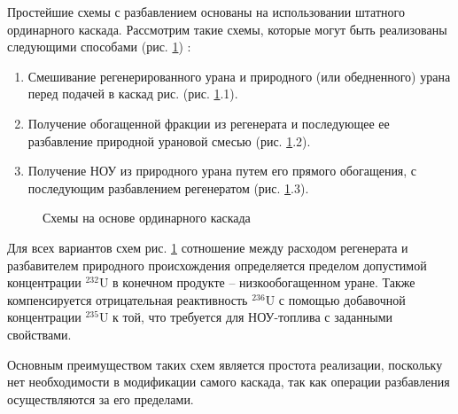 Простейшие схемы с разбавлением основаны на использовании штатного ординарного каскада. Рассмотрим такие схемы, которые могут быть реализованы следующими способами (рис. \ref{fig:diagram1}) \cite{sulaberidzeNekotoryhRazdelitelnyhProblemah2004,smirnovKaskadnyeShemyZadachah2012}:

\begin{enumerate}
  \item Смешивание регенерированного урана и природного (или обедненного) урана перед подачей в каскад рис. (рис. \ref{fig:diagram1}.1).
  \item Получение обогащенной фракции из регенерата и последующее ее разбавление природной урановой смесью (рис. \ref{fig:diagram1}.2).
  \item Получение НОУ из природного урана путем его прямого обогащения, с последующим разбавлением регенератом (рис. \ref{fig:diagram1}.3).
\end{enumerate}

\begin{figure}[ht]
  \caption{Схемы на основе ординарного каскада}\label{fig:diagram1}
\end{figure}

Для всех вариантов схем рис. \ref{fig:diagram1} сотношение между расходом регенерата и разбавителем природного происхождения определяется пределом допустимой концентрации $^{232}$U в конечном продукте -- низкообогащенном уране. Также компенсируется отрицательная реактивность $^{236}$U с помощью добавочной концентрации $^{235}$U к той, что требуется для НОУ-топлива с заданными свойствами.

Основным преимуществом таких схем является простота реализации, поскольку нет необходимости в модификации самого каскада, так как операции разбавления осуществляются за его пределами.

